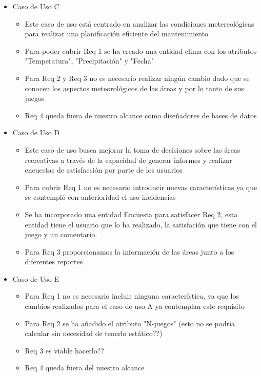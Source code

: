 \documentclass[]{article}
\begin{document}
\begin{itemize}
\begin{itemize}
        \item Caso de Uso C
        \begin{itemize}
            \item Este caso de uso está centrado en analizar las condiciones metereológicas para realizar una planificación eficiente del mantenimiento
            \item Para poder cubrir Req 1 se ha creado una entidad clima con los atributos "Temperatura", "Precipitación" y "Fecha"
            \item Para Req 2 y Req 3 no es necesario realizar ningún cambio dado que se conocen los aspectos meteorológicos de las áreas y por lo tanto de sus juegos
            \item Req 4 queda fuera de nuestro alcance como diseñadores de bases de datos
        \end{itemize}
        \item Caso de Uso D
        \begin{itemize}
            \item Este caso de uso busca mejorar la toma de decisiones sobre las áreas recreativas a través de la capacidad de generar informes y realizar encuestas de satisfacción por parte de los usuarios
            \item Para cubrir Req 1 no es necesario introducir nuevas características ya que se contempló con anterioridad el uso incidencias
            \item Se ha incorporado una entidad Encuesta para satisfacer Req 2, esta entidad tiene el usuario que lo ha realizado, la satisfación que tiene con el juego y un comentario. 
            \item Para Req 3 proporcionamos la información de las áreas junto a los diferentes reportes
        \end{itemize}
        \item Caso de Uso E
        \begin{itemize}
            \item Para Req 1 no es necesario incluir ninguna característica, ya que los cambios realizados para el caso de uso A ya contemplan este requisito
            \item Para Req 2 se ha añadido el atributo "N-juegos" (esto no se podría calcular sin necesidad de tenerlo estático??)
            \item Req 3 es viable hacerlo??
            \item Req 4 queda fuera del nuestro alcance
        \end{itemize}
    \end{itemize}
\end{itemize}
\end{document}
